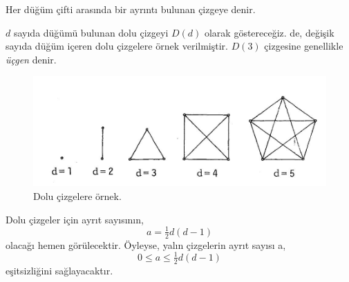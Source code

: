\documentclass[11pt]{amsbook}
\begin{document}

\begin{definition}
    Her düğüm çifti arasında bir ayrıntı bulunan çizgeye  denir.
    \par
    $d$ sayıda düğümü bulunan dolu çizgeyi $D(d)$ olarak göstereceğiz.  de, değişik sayıda düğüm içeren dolu çizgelere örnek verilmiştir. $D(3)$ çizgesine genellikle \emph{üçgen} denir.
\end{definition}
\begin{figure}[htb]
	\centering
	\includegraphics[width=1.00\textwidth]{images/ceyhun-011-fig01}
	\caption{Dolu çizgelere örnek.}
	\label{fig:doluCizgelereOrnek}
\end{figure}
\par \noindent
Dolu çizgeler için ayrıt sayısının,
   	 \[
		a = \tfrac{1}{2}d (d-1)
	\]
olacağı hemen görülecektir. Öyleyse, yalın çizgelerin ayrıt sayısı a,
	\[
        	0 \leq a \leq \tfrac{1}{2}d (d-1)
   	 \]
eşitsizliğini sağlayacaktır.
\end{document}
